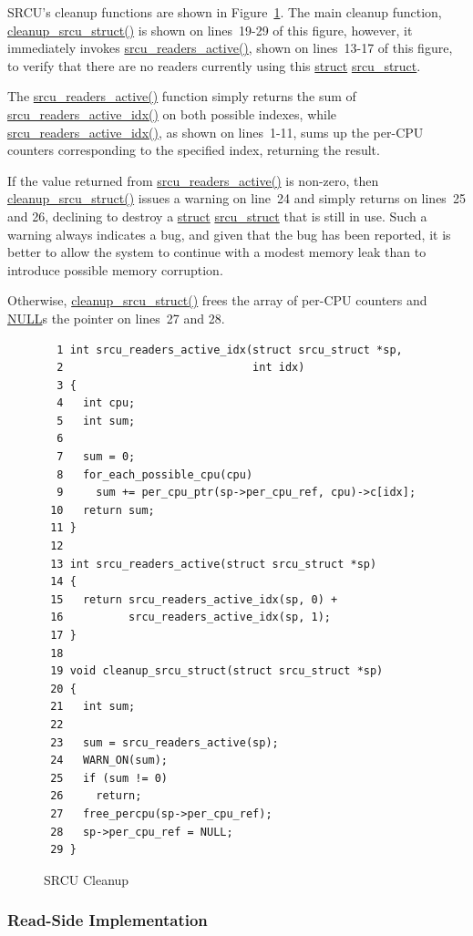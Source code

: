 SRCU's cleanup functions are shown in
Figure~\ref{fig:app:rcuimpl:SRCU Cleanup}.
The main cleanup function, \url{cleanup_srcu_struct()} is shown
on lines~19-29 of this figure, however, it immediately invokes
\url{srcu_readers_active()}, shown on lines~13-17 of this figure,
to verify that there are no readers currently using this
\url{struct} \url{srcu_struct}.

The \url{srcu_readers_active()} function simply returns the sum of
\url{srcu_readers_active_idx()} on both possible indexes,
while \url{srcu_readers_active_idx()}, as shown on lines~1-11,
sums up the per-CPU counters corresponding to the specified index,
returning the result.

If the value returned from \url{srcu_readers_active()} is non-zero,
then \url{cleanup_srcu_struct()} issues a warning on line~24 and
simply returns on lines~25 and 26, declining to destroy a
\url{struct} \url{srcu_struct} that is still in use.
Such a warning always indicates a bug, and given that the bug
has been reported, it is better to allow the system to continue
with a modest memory leak than to introduce possible memory corruption.

Otherwise, \url{cleanup_srcu_struct()} frees the array of per-CPU
counters and \url{NULL}s the pointer on lines~27 and 28.

\begin{figure}[htbp]
{ \scriptsize
\begin{verbatim}
  1 int srcu_readers_active_idx(struct srcu_struct *sp,
  2                             int idx)
  3 {
  4   int cpu;
  5   int sum;
  6
  7   sum = 0;
  8   for_each_possible_cpu(cpu)
  9     sum += per_cpu_ptr(sp->per_cpu_ref, cpu)->c[idx];
 10   return sum;
 11 }
 12
 13 int srcu_readers_active(struct srcu_struct *sp)
 14 {
 15   return srcu_readers_active_idx(sp, 0) +
 16          srcu_readers_active_idx(sp, 1);
 17 }
 18
 19 void cleanup_srcu_struct(struct srcu_struct *sp)
 20 {
 21   int sum;
 22
 23   sum = srcu_readers_active(sp);
 24   WARN_ON(sum);
 25   if (sum != 0)
 26     return;
 27   free_percpu(sp->per_cpu_ref);
 28   sp->per_cpu_ref = NULL;
 29 }
\end{verbatim}
}
\caption{SRCU Cleanup}
\label{fig:app:rcuimpl:SRCU Cleanup}
\end{figure}

\subsubsection{Read-Side Implementation}
\label{sec:app:rcuimpl:Read-Side Implementation}

